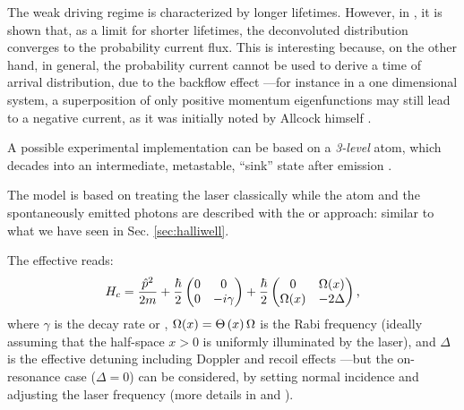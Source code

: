 The weak driving regime is characterized by longer lifetimes.
However, in \cite{Damborenea}, it is shown that,
as a limit for shorter lifetimes,
the deconvoluted distribution converges
to
the probability current flux.
This is interesting because, on the other hand, in general,
the probability current cannot be used to derive a time of arrival
distribution, due to the backflow effect
---for instance in a one dimensional system, a superposition of only positive momentum eigenfunctions may still lead to a
negative current, as it was initially noted by Allcock himself \parencite{Allcock-3}.

A possible experimental implementation can be based on a \emph{3-level} atom,
which decades into an intermediate, metastable, 
``sink'' state after emission \parencite{Metastable, TQM2}.

The model is based on treating the laser classically
while the atom and the spontaneously emitted photons are
described with the  or 
approach: similar to what we have seen in Sec. \ref{sec:halliwell}.


The effective  reads:
\begin{equation}\label{eq:eff_atom_laser_detect_H}
  {H}_{c} = \frac{\hat{p}^2}{2m} +
  \frac{\hbar}{2} \left(
    \begin{matrix}
      0 & 0\\
      0 & -\iu\gamma
    \end{matrix}
  \right)
  +
  \frac{\hbar}{2} \left(
    \begin{matrix}%
      0         & \Omega(x)\\
      \Omega(x) & -2\Delta
    \end{matrix}
  \right)
  \text{,}
\end{equation}
where $\gamma$ is the decay rate or ,
$\Omega(x) = \Theta\left(x\right)\Omega$ is the Rabi frequency (ideally assuming that the half-space $x>0$ is uniformly illuminated by the laser),
and $\Delta$ is the effective detuning including Doppler and recoil effects
---but the on-resonance case ($\Delta=0$) can be considered,
by setting normal incidence and adjusting the laser frequency
(more details in \cite{Damborenea} and \cite[]{TQM2}).

